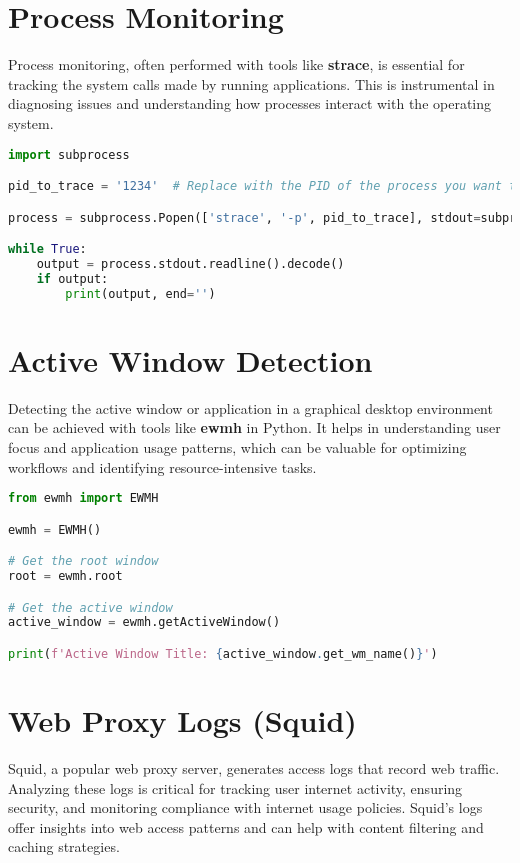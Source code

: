 \documentclass{VUMIFPSmagistrinis}
\begin{document}
\section{Process Monitoring}
Process monitoring, often performed with tools like \textbf{strace}, is essential for tracking the system calls made by running applications. This is instrumental in diagnosing issues and understanding how processes interact with the operating system.


\begin{lstlisting}[language=Python]
import subprocess

pid_to_trace = '1234'  # Replace with the PID of the process you want to trace

process = subprocess.Popen(['strace', '-p', pid_to_trace], stdout=subprocess.PIPE, stderr=subprocess.PIPE)

while True:
    output = process.stdout.readline().decode()
    if output:
        print(output, end='')
\end{lstlisting}

\section{Active Window Detection}
Detecting the active window or application in a graphical desktop environment can be achieved with tools like \textbf{ewmh} in Python. It helps in understanding user focus and application usage patterns, which can be valuable for optimizing workflows and identifying resource-intensive tasks.

\begin{lstlisting}[language=Python]
from ewmh import EWMH

ewmh = EWMH()

# Get the root window
root = ewmh.root

# Get the active window
active_window = ewmh.getActiveWindow()

print(f'Active Window Title: {active_window.get_wm_name()}')
\end{lstlisting}

\section{Web Proxy Logs (Squid)}
Squid, a popular web proxy server, generates access logs that record web traffic. Analyzing these logs is critical for tracking user internet activity, ensuring security, and monitoring compliance with internet usage policies. Squid's logs offer insights into web access patterns and can help with content filtering and caching strategies.
\end{document}
